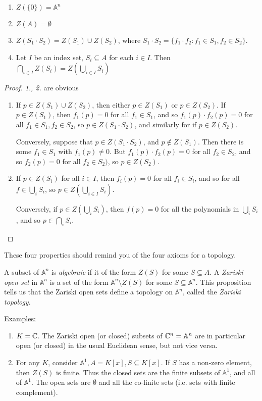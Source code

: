 \documentclass[10pt,a4paper]{article}
\begin{document}
\begin{proposition}
\item
\begin{enumerate}
\item $Z(\{0\}) = \mathbb{A}^n$
\item $Z(A) = \emptyset$
\item $Z(S_1\cdot S_2) = Z(S_1) \cup Z(S_2)$, where $S_1\cdot S_2 = \{f_1\cdot f_2 : f_1 \in S_1, f_2 \in S_2\}$.
\item Let $I$ be an index set, $S_i \subseteq A$ for each $i \in I$. Then $\bigcap_{i \in I} Z(S_i) = Z(\bigcup_{i \in I} S_i)$
\end{enumerate}
\end{proposition}
\begin{proof} \textit{1., 2.} are obvious
\begin{enumerate}
\item If $p \in Z(S_1) \cup Z(S_2)$, then either $p \in Z(S_1)$ or $p \in Z(S_2)$. If $p \in Z(S_1)$, then $f_1(p) = 0$ for all $f_1 \in S_1$, and so $f_1(p)\cdot f_2(p) = 0$ for all $f_1 \in S_1, f_2 \in S_2$, so $p \in Z(S_1\cdot S_2)$, and similarly for if $p \in Z(S_2)$.

Conversely, suppose that $p \in Z(S_1\cdot S_2)$, and $p \notin Z(S_1)$. Then there is some $f_1 \in S_1$ with $f_1(p) \neq 0$. But $f_1(p)\cdot f_2(p) = 0$ for all $f_2 \in S_2$, and so $f_2(p) = 0$ for all $f_2 \in S_2)$, so $p \in Z(S_2)$.

\item If $p \in Z(S_i)$ for all $i \in I$, then $f_i(p) = 0$ for all $f_i \in S_i$, and so for all $f \in \bigcup_{i} S_i$, so $p \in Z(\bigcup_{i \in I}S_i)$.

Conversely, if $p \in Z(\bigcup_i S_i)$, then $f(p) = 0$ for all the polynomials in $\bigcup_i S_i$, and so $p \in \bigcap_i S_i$.
\end{enumerate}
\end{proof}
These four properties should remind you of the four axioms for a topology.

A subset of $\mathbb{A}^n$ is \emph{algebraic} if it of the form $Z(S)$ for some $S\subseteq A$. A \emph{Zariski open set} in $\mathbb{A}^n$ is a set of the form $\mathbb{A}^n \setminus Z(S)$ for some $S \subseteq \mathbb{A}^n$. This proposition tells us that the Zariski open sets define a topology on $\mathbb{A}^n$, called the \emph{Zariski topology}.

\underline{Examples:}
\begin{enumerate}
\item $K = \mathbb{C}$. The Zariski open (or closed) subsets of $\mathbb{C}^n = \mathbb{A}^n$ are in particular open (or closed) in the usual Euclidean sense, but not vice versa.
\item For any $K$, consider $\mathbb{A}^1, A = K[x], S \subseteq K[x]$. If $S$ has a non-zero element, then $Z(S)$ is finite. Thus the closed sets are the finite subsets of $\mathbb{A}^1$, and all of $\mathbb{A}^1$. The open sets are $\emptyset$ and all the co-finite sets (i.e. sets with finite complement).
\end{enumerate}
\end{document}
